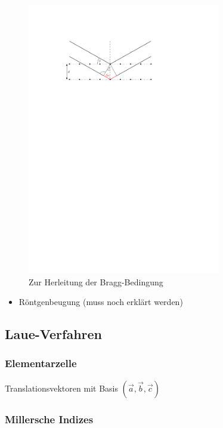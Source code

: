 \documentclass[10pt, a4paper]{article}
\begin{document}
\begin{figure}[h]
\centering
\includegraphics[width=0.75\textwidth]{./grafiken/bragg.pdf}
\caption{Zur Herleitung der Bragg-Bedingung}
\label{fig:bragg_bedingung}
\end{figure}

\begin{itemize}
  \item Röntgenbeugung (muss noch erklärt werden)
\end{itemize}

\subsection{Laue-Verfahren}

\subsubsection{Elementarzelle}
Translationsvektoren mit Basis $(\vec{a}, \vec{b}, \vec{c})$

\subsubsection{Millersche Indizes}
\end{document}
